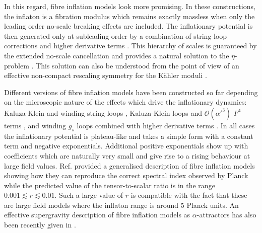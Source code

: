 \documentclass[11pt,a4paper]{article}
\newcommand{\mc}{\mathcal}
\begin{document}
In this regard, fibre inflation models \cite{Cicoli:2008gp} look more promising. In these constructions, the inflaton is a fibration modulus which remains exactly massless when only the leading order no-scale breaking effects are included. The inflationary potential is then generated only at subleading order by a combination of string loop corrections \cite{Berg:2005ja, Berg:2007wt, Berg:2014ama, Haack:2015pbv} and higher derivative terms \cite{Ciupke:2015msa, Grimm:2017okk}. This hierarchy of scales is guaranteed by the extended no-scale cancellation and provides a natural solution to the $\eta$-problem \cite{Cicoli:2007xp}. This solution can also be understood from the point of view of an effective non-compact rescaling symmetry for the K\"ahler moduli \cite{Burgess:2014tja}. 

Different versions of fibre inflation models have been constructed so far depending on the microscopic nature of the effects which drive the inflationary dynamics: Kaluza-Klein and winding string loops \cite{Cicoli:2008gp}, Kaluza-Klein loops and $\mc{O}(\alpha'^3)$ $F^4$ terms \cite{Broy:2015zba}, and winding $g_s$ loops combined with higher derivative terms \cite{Cicoli:2016chb}. In all cases the inflationary potential is plateau-like and takes a simple form with a constant term and negative exponentials. Additional positive exponentials show up with coefficients which are naturally very small and give rise to a rising behaviour at large field values. Ref. \cite{Burgess:2016owb} provided a generalised description of fibre inflation models showing how they can reproduce the correct spectral index observed by Planck \cite{Ade:2015lrj, Ade:2015xua} while the predicted value of the tensor-to-scalar ratio is in the range $0.001 \lesssim r\lesssim 0.01$. Such a large value of $r$ is compatible with the fact that these are large field models where the inflaton range is around $5$ Planck units. An effective supergravity description of fibre inflation models as $\alpha$-attractors has also been recently given in \cite{Kallosh:2017wku}. 
\end{document}

